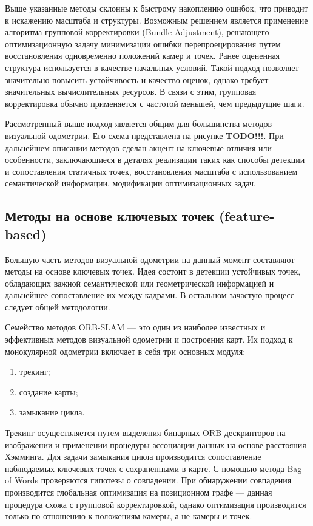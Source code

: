 Выше указанные методы склонны к быстрому накоплению ошибок, что приводит к искажению 
масштаба и структуры. Возможным решением является применение алгоритма групповой корректировки
(Bundle Adjustment), решающего оптимизационную задачу минимизации ошибки перепроецирования 
путем восстановления одновременно положений камер и точек. Ранее оцененная структура
используется в качестве начальных условий. Такой подход позволяет значительно повысить
устойчивость и качество оценок, однако требует значительных вычислительных ресурсов. 
В связи с этим, групповая корректировка обычно применяется с частотой меньшей, чем предыдущие
шаги.

Рассмотренный выше подход является общим для большинства методов визуальной одометрии. 
Его схема представлена на рисунке \textbf{TODO!!!}. При дальнейшем описании методов
сделан акцент на ключевые отличия или особенности, заключающиеся в 
деталях реализации таких как способы детекции и сопоставления статичных точек, 
восстановления масштаба с использованием семантической информации, модификации 
оптимизационных задач.

\subsection{Методы на основе ключевых точек (feature-based)}
Большую часть методов визуальной одометрии на данный момент составляют методы на 
основе ключевых точек. Идея состоит в детекции устойчивых точек, обладающих важной 
семантической или геометрической информацией и дальнейшее сопоставление их 
между кадрами. В остальном зачастую процесс следует общей методологии. 

Семейство методов ORB-SLAM --- это один из наиболее известных и эффективных методов визуальной 
одометрии и построения карт. Их подход к монокулярной одометрии включает в себя три основных модуля: 
\begin{enumerate}
    \item трекинг;
    \item создание карты;
    \item замыкание цикла.
\end{enumerate}
Трекинг осуществляется путем выделения бинарных ORB-дескрипторов на изображении и применении 
процедуры ассоциации данных на основе расстояния Хэмминга. Для задачи замыкания
цикла производится сопоставление наблюдаемых ключевых точек с сохраненными в карте.
С помощью метода Bag of Words проверяются гипотезы о совпадении. При обнаружении совпадения
производится глобальная оптимизация на позиционном графе --- данная процедура схожа с 
групповой корректировкой, однако оптимизация производится только по отношению к
положениям камеры, а не камеры и точек.

